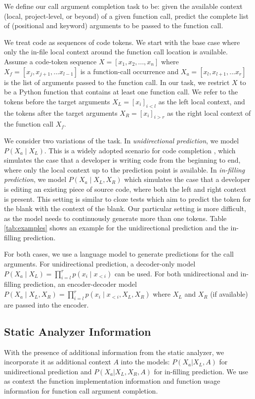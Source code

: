 We define our call argument completion task to be: given the available context (local, project-level, or beyond) of a given function call, predict the complete list of (positional and keyword) arguments to be passed to the function call. 

We treat code as sequences of code tokens.
We start with the base case where only the in-file local context around the function call location is available.
Assume a code-token sequence $X = [x_1, x_2, ..., x_n] $ where $ X_{f} = [x_j, x_{j+1}, ... x_{l-1} ] $ is a function-call occurrence and $X_{a} = [x_l, x_{l+1}, ... x_{r} ] $ is the list of arguments passed to the function call. 
In our task, we restrict $X$ to be a Python function that contains at least one function call. 
We refer to the tokens before the target arguments $ X_L = [x_{i}]_{i<l} $ as the left local context, and the tokens after the target arguments $ X_R = [x_i]_{i>r} $ as the right local context of the function call $X_f$. 


We consider two variations of the task.
In \emph{unidirectional prediction}, we model $ P(X_a \mid X_L) $. This is a widely adopted scenario for code completion \citep[e.g. ][]{karampatsis2020big, lu2021codexglue, kim2021code, lu2022reacc}, which simulates the case that a developer is writing code from the beginning to end, where only the local context up to the prediction point is available. 
In \emph{in-filling prediction}, we model $ P(X_a \mid X_L, X_R) $ which simulates the case that a developer is editing an existing piece of source code, where both the left and right context is present.
This setting is similar to cloze tests \cite{feng2020codebert} which aim to predict the token for the blank with the context of the blank. 
Our particular setting is more difficult, as the model needs to continuously generate more than one tokens.
Table \ref{tab:examples} shows an example for the unidirectional prediction and the in-filling prediction.

For both cases, we use a language model to generate predictions for the call arguments.
For unidirectional prediction, a decoder-only model $ P(X_a \mid X_L) = \prod_{i=l}^{r} p(x_i \mid x_{<i}) $ can be used.
For both unidirectional and in-filling prediction, an encoder-decoder model $ P(X_a \mid X_L, X_R) = \prod_{i=l}^{r} p(x_i \mid x_{<i}, X_L, X_R) $ where $ X_L $ and $ X_R $ (if available) are passed into the encoder.





\subsection{Static Analyzer Information}
With the presence of additional information from the static analyzer, we incorporate it as additional context $A$ into the models: $ P(X_a| X_L, A)$ for unidirectional prediction and $ P(X_a| X_L, X_R, A)$ for in-filling prediction.
We use as context the function implementation information and function usage information for function call argument completion.

